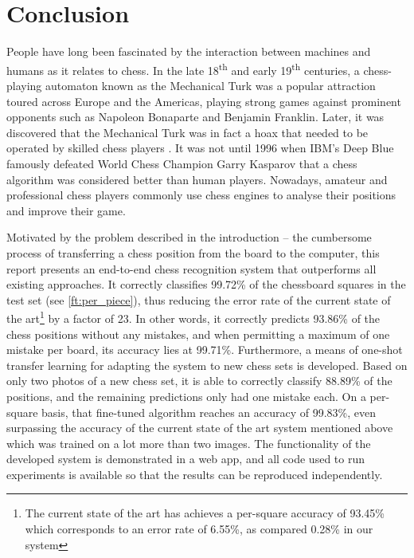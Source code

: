 \documentclass[../main.tex]{subfiles}
\begin{document}
\chapter{Conclusion}
\label{chap:conclusion}

People have long been fascinated by the interaction between machines and humans as it relates to chess.
In the late 18\textsuperscript{th} and early 19\textsuperscript{th} centuries, a chess-playing automaton known as the Mechanical Turk was a popular attraction toured across Europe and the Americas, playing strong games against prominent opponents such as Napoleon Bonaparte and Benjamin Franklin.
Later, it was discovered that the Mechanical Turk was in fact a hoax that needed to be operated by skilled chess players \cite{standage2003}.
It was not until 1996 when IBM's Deep Blue famously defeated World Chess Champion Garry Kasparov that a chess algorithm was considered better than human players.
Nowadays, amateur and professional chess players commonly use chess engines to analyse their positions and improve their game.

Motivated by the problem described in the introduction -- the cumbersome process of transferring a chess position from the board to the computer, this report presents an end-to-end chess recognition system that outperforms all existing approaches.
It correctly classifies 99.72\% of the chessboard squares in the test set (see \cref{ft:per_piece}), thus reducing the error rate of the current state of the art\footnote{The current state of the art has achieves a per-square accuracy of 93.45\% \cite{mehta2020} which corresponds to an error rate of 6.55\%, as compared 0.28\% in our system} by a factor of 23.
In other words, it correctly predicts 93.86\% of the chess positions without any mistakes, and when permitting a maximum of one mistake per board, its accuracy lies at 99.71\%.
Furthermore, a means of one-shot transfer learning for adapting the system to new chess sets is developed.
Based on only two photos of a new chess set, it is able to correctly classify 88.89\% of the positions, and the remaining predictions only had one mistake each.
On a per-square basis, that fine-tuned algorithm reaches an accuracy of 99.83\%, even surpassing the accuracy of the current state of the art system mentioned above which was trained on a lot more than two images.
The functionality of the developed system is demonstrated in a web app, and all code used to run experiments is available so that the results can be reproduced independently.
\end{document}
